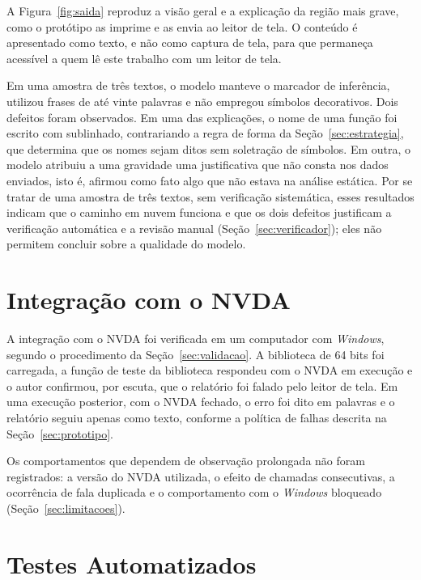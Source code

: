\documentclass[
    12pt,                   %
    openright,              %
    oneside,                %
    a4paper,                %
    sumario=tradicional,    %
    english,                %
    brazil,                 %
    ]{abntex2}
\begin{document}
A Figura~\ref{fig:saida} reproduz a visão geral e a explicação da região mais grave, como o protótipo as imprime e as envia ao leitor de tela. O conteúdo é apresentado como texto, e não como captura de tela, para que permaneça acessível a quem lê este trabalho com um leitor de tela.



Em uma amostra de três textos, o modelo manteve o marcador de inferência, utilizou frases de até vinte palavras e não empregou símbolos decorativos. Dois defeitos foram observados. Em uma das explicações, o nome de uma função foi escrito com sublinhado, contrariando a regra de forma da Seção~\ref{sec:estrategia}, que determina que os nomes sejam ditos sem soletração de símbolos. Em outra, o modelo atribuiu a uma gravidade uma justificativa que não consta nos dados enviados, isto é, afirmou como fato algo que não estava na análise estática. Por se tratar de uma amostra de três textos, sem verificação sistemática, esses resultados indicam que o caminho em nuvem funciona e que os dois defeitos justificam a verificação automática e a revisão manual (Seção~\ref{sec:verificador}); eles não permitem concluir sobre a qualidade do modelo.

\section{Integração com o NVDA}\label{sec:resultnvda}

A integração com o NVDA foi verificada em um computador com \textit{Windows}, segundo o procedimento da Seção~\ref{sec:validacao}. A biblioteca de 64 bits foi carregada, a função de teste da biblioteca respondeu com o NVDA em execução e o autor confirmou, por escuta, que o relatório foi falado pelo leitor de tela. Em uma execução posterior, com o NVDA fechado, o erro foi dito em palavras e o relatório seguiu apenas como texto, conforme a política de falhas descrita na Seção~\ref{sec:prototipo}.

Os comportamentos que dependem de observação prolongada não foram registrados: a versão do NVDA utilizada, o efeito de chamadas consecutivas, a ocorrência de fala duplicada e o comportamento com o \textit{Windows} bloqueado (Seção~\ref{sec:limitacoes}).

\section{Testes Automatizados}\label{sec:resulttestes}
\end{document}
